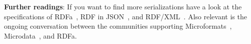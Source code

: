 
\medskip

\textbf{Further readings}:
If you want to find more serializations have a look at the specifications of RDFa~\cite{rdfa}, RDF in JSON~\cite{json-ld}, and RDF/XML~\cite{rdfxml}.
Also relevant is the ongoing conversation between the communities supporting Microformats~\cite{microformats}, Microdata~\cite{microdata}, and RDFa.

